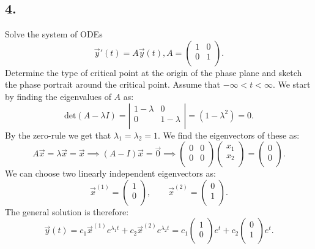 \subsection*{4.} Solve the system of ODEs
\[ 
\Vec{y}'(t) = A \Vec{y}(t), A = \begin{pmatrix}
1 & 0\\
0 & 1\\
\end{pmatrix}
.\]
Determine the type of critical point at the origin of the phase plane and sketch the phase portrait around the critical point. Assume that $- \infty < t < \infty$.
\bigbreak
We start by finding the eigenvalues of $A$ as:
\[ 
  \mathrm{det}(A - \lambda I) = \left| \begin{array}{cc}
  1 - \lambda & 0\\
  0 & 1 - \lambda\\
  \end{array} \right| = \left( 1 - \lambda^2 \right) = 0
.\]
By the zero-rule we get that $\lambda_1 = \lambda_2 = 1$. We find the eigenvectors of these as:
\[ 
A \Vec{x} = \lambda \Vec{x} = \Vec{x} \implies \left( A - I \right) \Vec{x} = \Vec{0} \implies \begin{pmatrix}
0 & 0\\
0 & 0\\
\end{pmatrix} \begin{pmatrix}
x_1\\
x_2\\
\end{pmatrix} = \begin{pmatrix}
0\\
0\\
\end{pmatrix}
.\]
We can choose two linearly independent eigenvectors as:
\[ 
\Vec{x}^{(1)} = \begin{pmatrix}
1\\
0\\
\end{pmatrix}, \qquad \Vec{x}^{(2)} = \begin{pmatrix}
0\\
1\\
\end{pmatrix}
.\]
The general solution is therefore:
\[ 
\Vec{y}(t) = c_1 \Vec{x}^{(1)} e^{\lambda_1 t} + c_2 \Vec{x}^{(2)} e^{\lambda_2 t} = c_1 \begin{pmatrix}
1\\
0\\
\end{pmatrix} e^{t} + c_2 \begin{pmatrix}
0\\
1\\
\end{pmatrix}e^{t}
.\]
